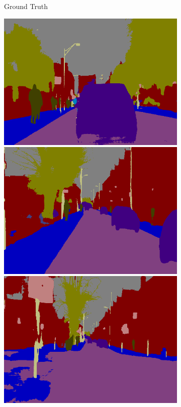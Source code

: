 \begin{figure}[t]
{\begin{subfigure}[t]{0.22\linewidth}
        \caption{Ground Truth}
    \end{subfigure}
    \begin{subfigure}[t]{0.22\linewidth}
        \centering
		\includegraphics[width=\linewidth]{segnet_1_output_1.png}
        \vspace{1px}
		\includegraphics[width=\linewidth]{segnet_13_output_1.png}
        \vspace{1px}
        \includegraphics[width=\linewidth]{segnet_2_output_1.png}

\end{subfigure}}
\end{figure}
